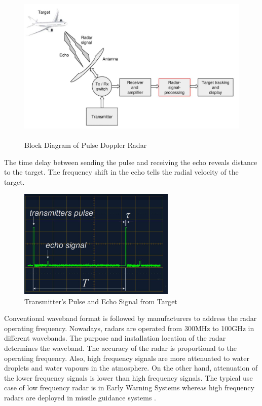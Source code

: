 \begin{figure}[h!]
	\centering
	\includegraphics[width=130mm, height=75mm]{figures/radar_principle}
	\caption{Block Diagram of Pulse Doppler Radar \cite{Ludl}}
	\label{fig:intro:radar:blockdia}
\end{figure}

The time delay between sending the pulse and receiving the echo reveals distance to the target. The frequency shift in the echo tells the radial velocity of the target.
\begin{figure}[h!]
	\centering
	\includegraphics[width=75mm]{figures/trRx}
	\caption{Transmitter's Pulse and Echo Signal from Target \cite{radarTut}}
	\label{fig:intro:radar:txrx}
\end{figure}

Conventional waveband format is followed by manufacturers to address the radar operating frequency. Nowadays, radars are operated from 300MHz to 100GHz in different wavebands. The purpose and installation location of the radar determines the waveband. The accuracy of the radar is proportional to the operating frequency. Also, high frequency signals are more attenuated to water droplets and water vapours in the atmosphere. On the other hand, attenuation of the lower frequency signals is lower than high frequency signals. The typical use case of low frequency radar is in Early Warning Systems whereas high frequency radars are deployed in missile guidance systems \cite{radarExample}.


